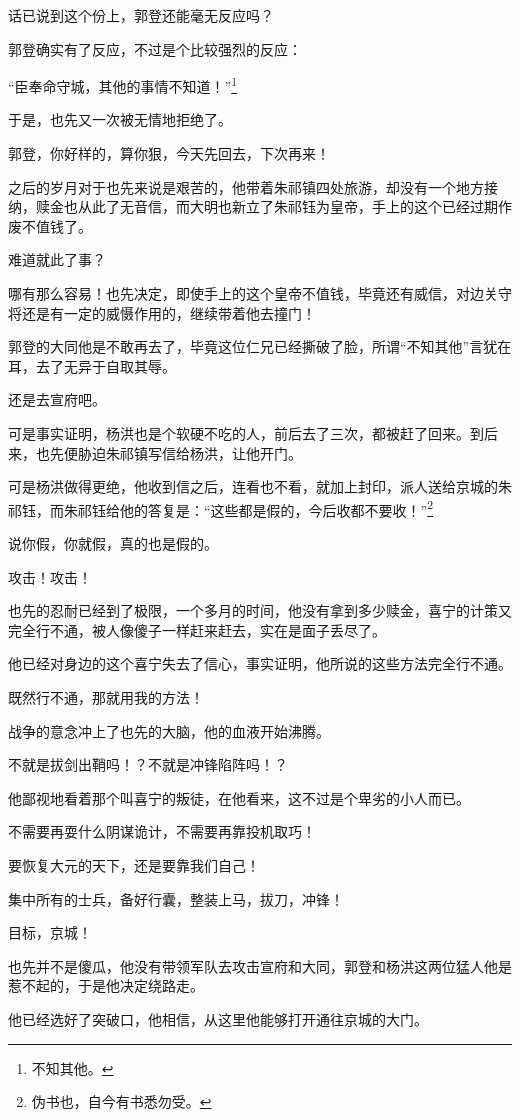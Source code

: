 \begin{multicols}{\theparacolNo}
话已说到这个份上，郭登还能毫无反应吗？

郭登确实有了反应，不过是个比较强烈的反应：

“臣奉命守城，其他的事情不知道！”\footnote{不知其他。}

于是，也先又一次被无情地拒绝了。

郭登，你好样的，算你狠，今天先回去，下次再来！

之后的岁月对于也先来说是艰苦的，他带着朱祁镇四处旅游，却没有一个地方接纳，赎金也从此了无音信，而大明也新立了朱祁钰为皇帝，手上的这个已经过期作废不值钱了。

难道就此了事？

哪有那么容易！也先决定，即使手上的这个皇帝不值钱，毕竟还有威信，对边关守将还是有一定的威慑作用的，继续带着他去撞门！

郭登的大同他是不敢再去了，毕竟这位仁兄已经撕破了脸，所谓“不知其他”言犹在耳，去了无异于自取其辱。

还是去宣府吧。

可是事实证明，杨洪也是个软硬不吃的人，前后去了三次，都被赶了回来。到后来，也先便胁迫朱祁镇写信给杨洪，让他开门。

可是杨洪做得更绝，他收到信之后，连看也不看，就加上封印，派人送给京城的朱祁钰，而朱祁钰给他的答复是：“这些都是假的，今后收都不要收！”\footnote{伪书也，自今有书悉勿受。}

说你假，你就假，真的也是假的。

攻击！攻击！

也先的忍耐已经到了极限，一个多月的时间，他没有拿到多少赎金，喜宁的计策又完全行不通，被人像傻子一样赶来赶去，实在是面子丢尽了。

他已经对身边的这个喜宁失去了信心，事实证明，他所说的这些方法完全行不通。

既然行不通，那就用我的方法！

战争的意念冲上了也先的大脑，他的血液开始沸腾。

不就是拔剑出鞘吗！？不就是冲锋陷阵吗！？

他鄙视地看着那个叫喜宁的叛徒，在他看来，这不过是个卑劣的小人而已。

不需要再耍什么阴谋诡计，不需要再靠投机取巧！

要恢复大元的天下，还是要靠我们自己！

集中所有的士兵，备好行囊，整装上马，拔刀，冲锋！

目标，京城！

也先并不是傻瓜，他没有带领军队去攻击宣府和大同，郭登和杨洪这两位猛人他是惹不起的，于是他决定绕路走。

他已经选好了突破口，他相信，从这里他能够打开通往京城的大门。


\end{multicols}
